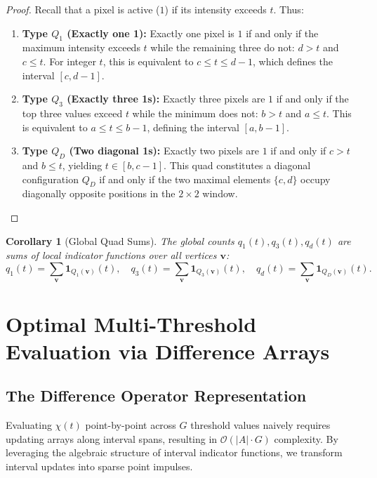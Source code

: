 \documentclass[11pt,a4paper]{article}
\theoremstyle{plain}
\newtheorem{corollary}[theorem]{Corollary}
\theoremstyle{definition}
\theoremstyle{remark}
\newcommand{\indicator}{\mathbf{1}}
\begin{document}
\begin{proof}
Recall that a pixel is active ($1$) if its intensity exceeds $t$. Thus:
\begin{enumerate}
    \item \textbf{Type $Q_1$ (Exactly one 1):} Exactly one pixel is $1$ if and only if the maximum intensity exceeds $t$ while the remaining three do not: $d > t$ and $c \le t$. For integer $t$, this is equivalent to $c \le t \le d-1$, which defines the interval $[c, d-1]$.
    \item \textbf{Type $Q_3$ (Exactly three 1s):} Exactly three pixels are $1$ if and only if the top three values exceed $t$ while the minimum does not: $b > t$ and $a \le t$. This is equivalent to $a \le t \le b-1$, defining the interval $[a, b-1]$.
    \item \textbf{Type $Q_D$ (Two diagonal 1s):} Exactly two pixels are $1$ if and only if $c > t$ and $b \le t$, yielding $t \in [b, c-1]$. This quad constitutes a diagonal configuration $Q_D$ if and only if the two maximal elements $\{c, d\}$ occupy diagonally opposite positions in the $2 \times 2$ window. \qedhere
\end{enumerate}
\end{proof}

\begin{corollary}[Global Quad Sums]
The global counts $q_1(t), q_3(t), q_d(t)$ are sums of local indicator functions over all vertices $\mathbf{v}$:
\begin{equation}
    q_1(t) = \sum_{\mathbf{v}} \indicator_{Q_1(\mathbf{v})}(t), \quad q_3(t) = \sum_{\mathbf{v}} \indicator_{Q_3(\mathbf{v})}(t), \quad q_d(t) = \sum_{\mathbf{v}} \indicator_{Q_D(\mathbf{v})}(t).
\end{equation}
\end{corollary}

\section{Optimal Multi-Threshold Evaluation via Difference Arrays}

\subsection{The Difference Operator Representation}

Evaluating $\chi(t)$ point-by-point across $G$ threshold values naively requires updating arrays along interval spans, resulting in $\mathcal{O}(|A| \cdot G)$ complexity. By leveraging the algebraic structure of interval indicator functions, we transform interval updates into sparse point impulses.
\end{document}
